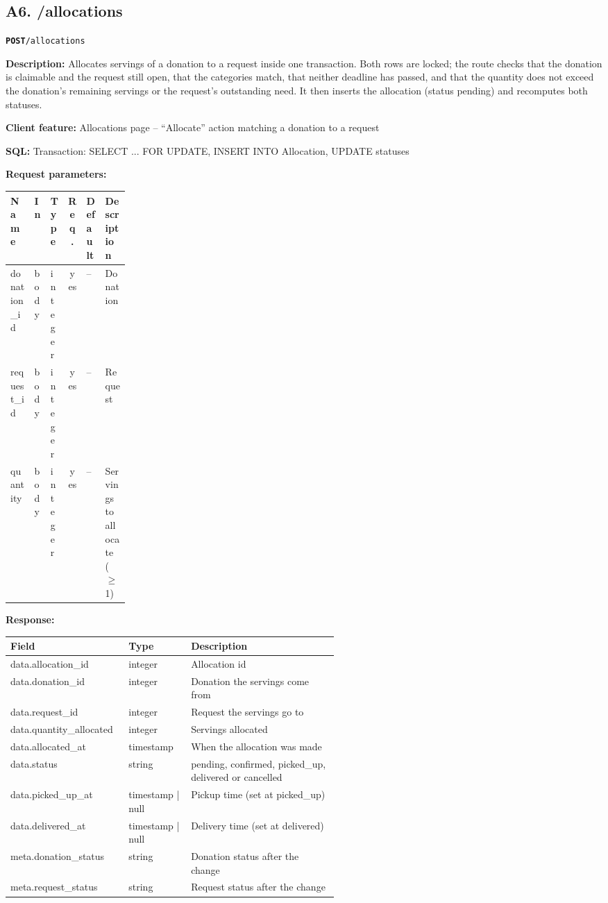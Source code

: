 \documentclass[11pt,letterpaper]{article}
\newcommand{\brk}{\penalty0\relax}
\newcommand{\routebar}[2]{%
  \par\noindent\colorbox{boxGray}{\parbox{\dimexpr\linewidth-2\fboxsep}{%
  \strut\textbf{\texttt{#1}}\quad\texttt{#2}\strut}}\par\smallskip}
\newcommand{\kv}[2]{\textbf{#1:} #2\par}
\begin{document}
\subsection*{A6. /allocations}
\routebar{POST}{/allocations}
\kv{Description}{Allocates servings of a donation to a request inside one transaction. Both rows are locked; the route checks that the donation is claimable and the request still open, that the categories match, that neither deadline has passed, and that the quantity does not exceed the donation's remaining servings or the request's outstanding need. It then inserts the allocation (status pending) and recomputes both statuses.}
\kv{Client feature}{Allocations page -- ``Allocate'' action matching a donation to a request}
\kv{SQL}{Transaction: SELECT ... FOR UPDATE, INSERT INTO Allocation, UPDATE statuses}
\kv{Request parameters}{}
\begin{xltabular}{\linewidth}{>{\ttfamily\raggedright\arraybackslash}p{0.2\linewidth} l l c l >{\raggedright\arraybackslash}X}
\toprule
\textrm{\textbf{Name}} & \textbf{In} & \textbf{Type} & \textbf{Req.} & \textbf{Default} & \textbf{Description} \\
\midrule
donation\_\brk{}id & body & integer & yes & -- & Donation \\
request\_\brk{}id & body & integer & yes & -- & Request \\
quantity & body & integer & yes & -- & Servings to allocate ($\ge$ 1) \\
\bottomrule
\end{xltabular}
\kv{Response}{}
\begin{xltabular}{\linewidth}{>{\ttfamily\raggedright\arraybackslash}p{0.36\linewidth} >{\raggedright\arraybackslash}p{0.19\linewidth} >{\raggedright\arraybackslash}X}
\toprule
\textrm{\textbf{Field}} & \textbf{Type} & \textbf{Description} \\
\midrule
data.\brk{}allocation\_id & integer & Allocation id \\
data.\brk{}donation\_id & integer & Donation the servings come from \\
data.\brk{}request\_id & integer & Request the servings go to \\
data.\brk{}quantity\_allocated & integer & Servings allocated \\
data.\brk{}allocated\_at & timestamp & When the allocation was made \\
data.\brk{}status & string & pending, confirmed, picked\_up, delivered or cancelled \\
data.\brk{}picked\_up\_at & timestamp | null & Pickup time (set at picked\_up) \\
data.\brk{}delivered\_at & timestamp | null & Delivery time (set at delivered) \\
meta.\brk{}donation\_status & string & Donation status after the change \\
meta.\brk{}request\_status & string & Request status after the change \\
\bottomrule
\end{xltabular}
\end{document}
